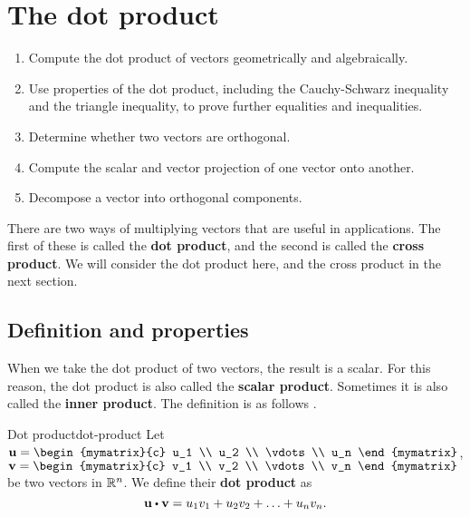 \section{The dot product}

\begin{outcome}
  \begin{enumerate}
  \item Compute the dot product of vectors geometrically and
    algebraically.
  \item Use properties of the dot product, including the
    Cauchy-Schwarz inequality and the triangle inequality, to prove
    further equalities and inequalities.
  \item Determine whether two vectors are orthogonal.
  \item Compute the scalar and vector projection of one vector onto
    another.
  \item Decompose a vector into orthogonal components.
  \end{enumerate}
\end{outcome}

There are two ways of multiplying vectors that are useful in
applications. The first of these is called the \textbf{dot product},
and the second is called the \textbf{cross product}. We will consider
the dot product here, and the cross product in the next section.

\subsection{Definition and properties}

When we take the dot product of two vectors, the result is a
scalar. For this reason, the dot product is also called the
\textbf{scalar product}. Sometimes it is also called the \textbf{inner
  product}. The definition is as follows%
%
%
.

\begin{definition}{Dot product}{dot-product}
  Let $\vect{u}=\begin{mymatrix}{c}
    u_1 \\
    u_2 \\
    \vdots \\
    u_n
  \end{mymatrix}$, $\vect{v}= \begin{mymatrix}{c}
    v_1 \\
    v_2 \\
    \vdots \\
    v_n
  \end{mymatrix}$ be two vectors in $\mathbb{R}^{n}$. We
  define their \textbf{dot product} as
  \begin{equation*}
    \vect{u}\dotprod \vect{v} = u_1v_1+u_2v_2+\ldots+u_nv_n.
  \end{equation*}
\end{definition}


